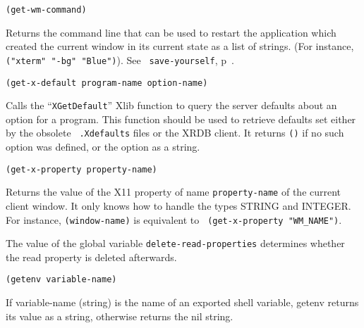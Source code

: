 
{\usagefont\begin{verbatim}
(get-wm-command)
\end{verbatim}}\usageupspace

Returns the command line that can be used to restart the application
which created the current window in its current state as a list of
strings.  (For instance, \verb|("xterm" "-bg" "Blue")|). See {\tt
save-yourself}, p~\pageref{save-yourself}.


{\usagefont\begin{verbatim}
(get-x-default program-name option-name)
\end{verbatim}}\usageupspace

Calls the ``{\tt XGetDefault}'' Xlib function to
query the server defaults about an option for a program. This function
should be used to retrieve defaults set either by the obsolete {\tt
.Xdefaults} files or the XRDB client. It returns \verb"()" if no such
option was defined, or the option as a {\WOOL} string.

        
{\usagefont\begin{verbatim}
(get-x-property property-name)
\end{verbatim}}\usageupspace

Returns the value of the X11 property of name \verb"property-name" of
the current client window. It only knows how to handle the types STRING
and INTEGER. For instance, {\tt (window-name)} is equivalent to {\tt
(get-x-property "WM\_NAME")}.

The value of the global variable \verb|delete-read-properties| determines
whether the read property is deleted afterwards.

        
{\usagefont\begin{verbatim}
(getenv variable-name)
\end{verbatim}}\usageupspace

If variable-name (string) is the name of an exported shell variable, getenv
returns its value as a string, otherwise returns the nil string.



